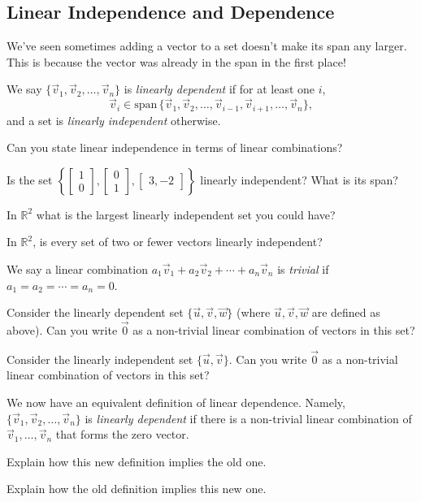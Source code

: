 \documentclass{article}
\newcommand{\R}{\mathbb{R}}
\renewcommand{\span}{\mathrm{span}\,}
\newcommand{\mat}[1]{\begin{bmatrix}#1\end{bmatrix}}
\begin{document}
\subsection*{Linear Independence and Dependence}
	We've seen sometimes adding a vector to a set doesn't
	make its span any larger.  This is because the vector was already
	in the span in the first place!

	We say $\{\vec v_1,\vec v_2,\ldots,\vec v_n\}$ is
	\emph{linearly dependent} if for at least one $i$,
	\[
		\vec v_i\in\span\{\vec v_1,\vec v_2,\ldots,\vec v_{i-1},
		\vec v_{i+1},\ldots,\vec v_n\},
	\]
	and a set is \emph{linearly independent} otherwise.

	\begin{Enum}
		\item Can you state linear independence in terms
		of linear combinations?
		\item Is the set $\left\{\mat{1\\0},\mat{0\\1},
		\mat{3,-2}\right\}$ linearly independent?
		What is its span?
		\item In $\R^2$ what is the largest linearly
		independent set you could have?
		\item In $\R^2$, is every set of two or fewer
		vectors linearly independent?
	\end{Enum}

	We say a linear combination 
	$a_1\vec v_1+a_2\vec v_2+\cdots +a_n\vec v_n$
	is \emph{trivial} if $a_1=a_2=\cdots=a_n=0$.
	\begin{Enum}
		\item Consider the linearly dependent 
		set $\{\vec u,\vec v,\vec w\}$ (where $\vec u,\vec v,\vec w$
		are defined as above).  Can you write $\vec 0$
		as a non-trivial linear combination of vectors in this set?
		\item Consider the linearly independent 
		set $\{\vec u,\vec v\}$.  Can you write $\vec 0$
		as a non-trivial linear combination of vectors in this set?
	\end{Enum}

	We now have an equivalent definition of linear dependence.
	Namely, $\{\vec v_1,\vec v_2,\ldots,\vec v_n\}$ is
	\emph{linearly dependent} if there is a non-trivial
	linear combination of $\vec v_1,\ldots,\vec v_n$ that
	forms the zero vector.

	\begin{Enum}
		\item Explain how this new definition implies the old one.
		\item Explain how the old definition implies this new one.
	\end{Enum}
\end{document}
